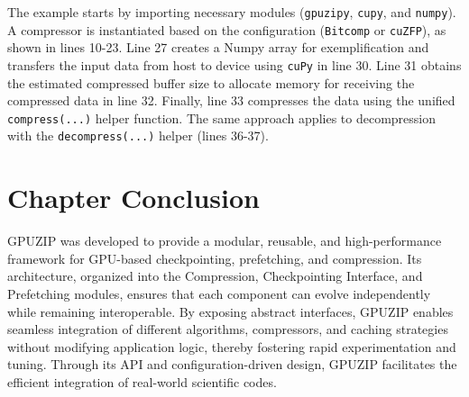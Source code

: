 \documentclass[Ingles,Final]{ic-tese-v3}
\begin{document}
The example starts by importing necessary modules (\texttt{gpuzipy}, \texttt{cupy}, and \texttt{numpy}). A compressor is instantiated based on the configuration (\texttt{Bitcomp} or \texttt{cuZFP}), as shown in lines 10-23. Line 27 creates a Numpy array for exemplification and transfers the input data from host to device using \texttt{cuPy} in line 30. Line 31 obtains the estimated compressed buffer size to allocate memory for receiving the compressed data in line 32. Finally, line 33 compresses the data using the unified \texttt{compress(...)} helper function. The same approach applies to decompression with the \texttt{decompress(...)} helper (lines 36-37).

\section{Chapter Conclusion}

GPUZIP was developed to provide a modular, reusable, and high-performance framework for GPU-based checkpointing, prefetching, and compression. Its architecture, organized into the Compression, Checkpointing Interface, and Prefetching modules, ensures that each component can evolve independently while remaining interoperable. By exposing abstract interfaces, GPUZIP enables seamless integration of different algorithms, compressors, and caching strategies without modifying application logic, thereby fostering rapid experimentation and tuning. Through its API and configuration-driven design, GPUZIP facilitates the efficient integration of real-world scientific codes.
\end{document}
